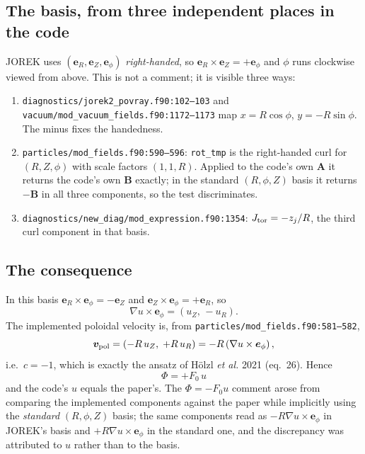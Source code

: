 \documentclass[11pt,a4paper]{article}
\newcommand{\code}[1]{\texttt{\small #1}}
\newcommand{\ephi}{\bm{e}_\phi}
\begin{document}
\subsection{The basis, from three independent places in the code}

JOREK uses $(\bm{e}_R,\bm{e}_Z,\ephi)$ \emph{right-handed}, so
$\bm{e}_R\times\bm{e}_Z=+\ephi$ and $\phi$ runs clockwise viewed from above. This is not a comment;
it is visible three ways:
\begin{enumerate}\itemsep2pt
\item \code{diagnostics/jorek2\_povray.f90:102--103} and
      \code{vacuum/mod\_vacuum\_fields.f90:1172--1173} map
      $x=R\cos\phi$, $y=-R\sin\phi$. The minus fixes the handedness.
\item \code{particles/mod\_fields.f90:590--596}: \code{rot\_tmp} is the right-handed curl for
      $(R,Z,\phi)$ with scale factors $(1,1,R)$. Applied to the code's own $\bm{A}$ it returns the
      code's own $\bm{B}$ exactly; in the standard $(R,\phi,Z)$ basis it returns $-\bm{B}$ in all
      three components, so the test discriminates.
\item \code{diagnostics/new\_diag/mod\_expression.f90:1354}: $J_{\rm tor}=-z_j/R$, the third curl
      component in that basis.
\end{enumerate}

\subsection{The consequence}

In this basis $\bm{e}_R\times\ephi=-\bm{e}_Z$ and $\bm{e}_Z\times\ephi=+\bm{e}_R$, so
\begin{equation}
  \nabla u\times\ephi=\left(u_Z,\,-u_R\right).
\end{equation}
The implemented poloidal velocity is, from \code{particles/mod\_fields.f90:581--582},
\begin{equation}
  \bm{v}_{\rm pol}=\left(-R\,u_Z,\;+R\,u_R\right)=-R\left(\nabla u\times\ephi\right),
\end{equation}
i.e.\ $c=-1$, which is exactly the ansatz of H\"olzl \emph{et al.} 2021 (eq.~26). Hence
\begin{equation}
  \boxed{\;\Phi=+F_0\,u\;}
\end{equation}
and the code's $u$ equals the paper's. The $\Phi=-F_0u$ comment arose from comparing the
implemented components against the paper while implicitly using the \emph{standard}
$(R,\phi,Z)$ basis; the same components read as $-R\nabla u\times\ephi$ in JOREK's basis and
$+R\nabla u\times\ephi$ in the standard one, and the discrepancy was attributed to $u$ rather than
to the basis.
\end{document}
